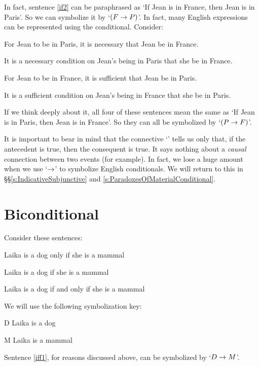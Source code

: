 In fact, sentence \ref{if2} can be paraphrased as `If Jean is in France, then Jean is in Paris'. So we can symbolize it by `$(F \rightarrow P)$'.
\noindent In fact, many English expressions can be represented using the conditional. Consider:
	\begin{earg}
		\item[\ex{ifnec1}] For Jean to be in Paris, it is necessary that Jean be in France.
		\item[\ex{ifnec2}] It is a necessary condition on Jean's being in Paris that she be in France. 
		\item[\ex{ifsuf1}] For Jean to be in France, it is sufficient that Jean be in Paris.
		\item[\ex{ifsuf2}] It is a sufficient condition on Jean's being in France that she be in Paris.
	\end{earg}
If we think deeply about it, all four of these sentences mean the same as  `If Jean is in Paris, then Jean is in France'. So they can all be symbolized by `$(P \rightarrow F)$'. 

It is important to bear in mind that the connective `\eif' tells us only that, if the antecedent is true, then the consequent is true. It says nothing about a \emph{causal} connection between two events (for example). In fact, we lose a huge amount when we use `$\rightarrow$' to symbolize English conditionals. We will return to this in \S\S\ref{s:IndicativeSubjunctive} and \ref{s:ParadoxesOfMaterialConditional}.

\section{Biconditional}
Consider these sentences:
	\begin{earg}
		\item[\ex{iff1}] Laika is a dog only if she is a mammal
		\item[\ex{iff2}] Laika is a dog if she is a mammal
		\item[\ex{iff3}] Laika is a dog if and only if she is a mammal
	\end{earg}
We will use the following symbolization key:
	\begin{ekey}
		\item[D] Laika is a dog
		\item[M] Laika is a mammal
	\end{ekey}
Sentence \ref{iff1}, for reasons discussed above, can be symbolized by `$D \rightarrow M$'.

